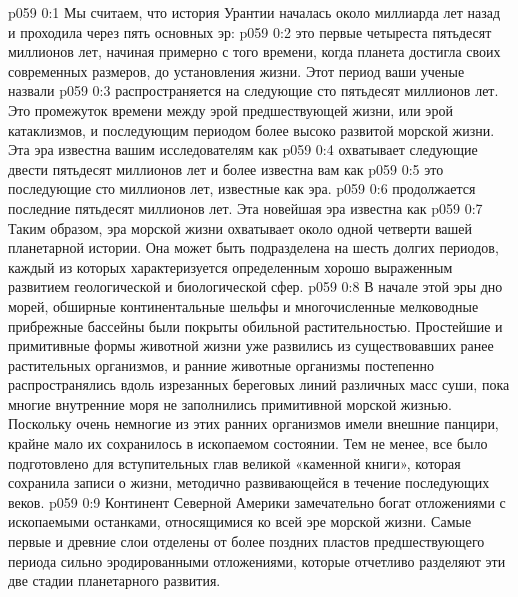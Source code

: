 \author{Носитель Жизни}
\vs p059 0:1 Мы считаем, что история Урантии началась около миллиарда лет назад и проходила через пять основных эр:
\vs p059 0:2 \bibnobreakspace {} это первые четыреста пятьдесят миллионов лет, начиная примерно с того времени, когда планета достигла своих современных размеров, до установления жизни. Этот период ваши ученые назвали 
\vs p059 0:3 \pc {}\bibnobreakspace {} распространяется на следующие сто пятьдесят миллионов лет. Это промежуток времени между эрой предшествующей жизни, или эрой катаклизмов, и последующим периодом более высоко развитой морской жизни. Эта эра известна вашим исследователям как 
\vs p059 0:4 \pc {}\bibnobreakspace {} охватывает следующие двести пятьдесят миллионов лет и более известна вам как 
\vs p059 0:5 \pc {}\bibnobreakspace {} это последующие сто миллионов лет, известные как  эра.
\vs p059 0:6 \pc {}\bibnobreakspace {} продолжается последние пятьдесят миллионов лет. Эта новейшая эра известна как 
\vs p059 0:7 \pc Таким образом, эра морской жизни охватывает около одной четверти вашей планетарной истории. Она может быть подразделена на шесть долгих периодов, каждый из которых характеризуется определенным хорошо выраженным развитием геологической и биологической сфер.
\vs p059 0:8 В начале этой эры дно морей, обширные континентальные шельфы и многочисленные мелководные прибрежные бассейны были покрыты обильной растительностью. Простейшие и примитивные формы животной жизни уже развились из существовавших ранее растительных организмов, и ранние животные организмы постепенно распространялись вдоль изрезанных береговых линий различных масс суши, пока многие внутренние моря не заполнились примитивной морской жизнью. Поскольку очень немногие из этих ранних организмов имели внешние панцири, крайне мало их сохранилось в ископаемом состоянии. Тем не менее, все было подготовлено для вступительных глав великой «каменной книги», которая сохранила записи о жизни, методично развивающейся в течение последующих веков.
\vs p059 0:9 Континент Северной Америки замечательно богат отложениями с ископаемыми останками, относящимися ко всей эре морской жизни. Самые первые и древние слои отделены от более поздних пластов предшествующего периода сильно эродированными отложениями, которые отчетливо разделяют эти две стадии планетарного развития.
